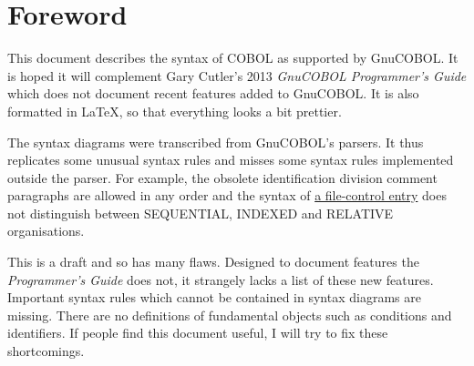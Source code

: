 \chapter{Foreword}

This document describes the syntax of COBOL as supported by GnuCOBOL. It is hoped it will complement Gary Cutler's 2013 \textit{GnuCOBOL Programmer's Guide} which does not document recent features added to GnuCOBOL. It is also formatted in \LaTeX, so that everything looks a bit prettier.

The syntax diagrams were transcribed from GnuCOBOL's parsers. It thus replicates some unusual syntax rules and misses some syntax rules implemented outside the parser. For example, the obsolete identification division comment paragraphs are allowed in any order and the syntax of \hyperref[file-control-entry]{a file-control entry} does not distinguish between SEQUENTIAL, INDEXED and RELATIVE organisations.

This is a draft and so has many flaws. Designed to document features the \textit{Programmer's Guide} does not, it strangely lacks a list of these new features. Important syntax rules which cannot be contained in syntax diagrams are missing. There are no definitions of fundamental objects such as conditions and identifiers. If people find this document useful, I will try to fix these shortcomings.

